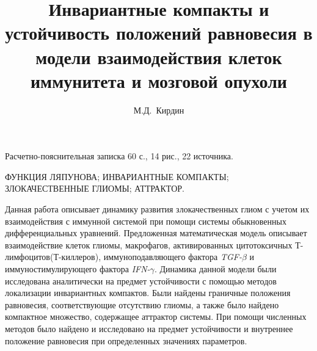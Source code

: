 \documentclass[14pt,a4paper]{extarticle}
\title{Инвариантные компакты и устойчивость положений равновесия в модели взаимодействия клеток иммунитета и мозговой опухоли}
\author{М.Д.~Кирдин}
\begin{document}
	\maketitle
	
	\begin{annotation}
	
	Расчетно-пояснительная записка 60 с., 14 рис., 22  источника.
	
	\MakeUppercase{функция Ляпунова; инвариантные компакты; злокачественные глиомы; аттрактор.}
	
	Данная работа описывает динамику развития злокачественных глиом с учетом их взаимодействия с иммунной системой при помощи системы обыкновенных дифференциальных уравнений. Предложенная математическая модель описывает взаимодействие клеток глиомы, макрофагов, активированных цитотоксичных Т-лимфоцитов(Т-киллеров), иммуноподавляющего фактора \textit{TGF-}$\beta$ и иммуностимулирующего фактора \textit{IFN-}$\gamma$. Динамика данной модели были исследована аналитически на предмет устойчивости с помощью методов локализации инвариантных компактов. Были найдены граничные положения равновесия, соответствующие отсутствию глиомы, а также было найдено компактное множество, содержащее аттрактор системы. При помощи численных методов было найдено и исследовано на предмет устойчивости и внутреннее положение равновесия при определенных значениях параметров.
	
	\end{annotation}
	
	\tableofcontents
	
\end{document}
